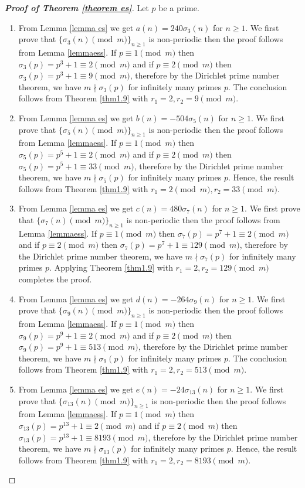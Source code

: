 \documentclass[12pt,reqno]{amsart}
\begin{document}
\begin{proof}[\textbf{Proof of Theorem \ref{theorem es}}]
Let $p$ be a prime. 
\noindent
\begin{enumerate}
    \item From Lemma \ref{lemma es} we get $a(n)=240\sigma_3(n)$ for $n\geq1$. We first prove that $\{\sigma_3(n) \pmod{m}\}_{n\geq1}$ is non-periodic then the proof follows from Lemma \ref{lemmaess}. If $p\equiv 1 \pmod{m}$ then $\sigma_3(p)=p^3+1\equiv 2 \pmod{m}$ and if $p\equiv 2 \pmod{m}$ then $\sigma_3(p)=p^3+1\equiv 9 \pmod{m}$, therefore by the Dirichlet prime number theorem, we have $m\nmid \sigma_3(p)$ for infinitely many primes $p$. The conclusion follows from Theorem \ref{thm1.9} with $r_1=2,r_2=9 \pmod{m}$.
    \item From Lemma \ref{lemma es} we get $b(n)=-504\sigma_5(n)$ for $n\geq1$. We first prove that $\{\sigma_5(n) \pmod{m}\}_{n\geq1}$ is non-periodic then the proof follows from Lemma \ref{lemmaess}. If $p\equiv 1 \pmod{m}$ then $\sigma_5(p)=p^5+1\equiv 2 \pmod{m}$ and if $p\equiv 2 \pmod{m}$ then $\sigma_5(p)=p^5+1\equiv 33 \pmod{m}$, therefore by the Dirichlet prime number theorem, we have $m\nmid \sigma_5(p)$ for infinitely many primes $p$. Hence, the result follows from Theorem \ref{thm1.9} with $r_1=2 \pmod{m},r_2=33 \pmod{m}$.
     \item From Lemma \ref{lemma es} we get $c(n)=480\sigma_7(n)$ for $n\geq1$. We first prove that $\{\sigma_7(n) \pmod{m}\}_{n\geq1}$ is non-periodic then the proof follows from Lemma \ref{lemmaess}. If $p\equiv 1 \pmod{m}$ then $\sigma_7(p)=p^7+1\equiv 2 \pmod{m}$ and if $p\equiv 2 \pmod{m}$ then $\sigma_7(p)=p^7+1\equiv 129 \pmod{m}$, therefore by the Dirichlet prime number theorem, we have $m\nmid \sigma_7(p)$ for infinitely many primes $p$. Applying Theorem \ref{thm1.9} with $r_1=2,r_2=129\pmod{m}$ completes the proof.
      \item From Lemma \ref{lemma es} we get $d(n)=-264\sigma_9(n)$ for $n\geq1$. We first prove that $\{\sigma_9(n) \pmod{m}\}_{n\geq1}$ is non-periodic then the proof follows from Lemma \ref{lemmaess}. If $p\equiv 1 \pmod{m}$ then $\sigma_9(p)=p^9+1\equiv 2 \pmod{m}$ and if $p\equiv 2 \pmod{m}$ then $\sigma_9(p)=p^9+1\equiv 513\pmod{m}$, therefore by the Dirichlet prime number theorem, we have $m\nmid \sigma_9(p)$ for infinitely many primes $p$. The conclusion follows from Theorem \ref{thm1.9} with $r_1=2,r_2=513\pmod{m}$.
       \item From Lemma \ref{lemma es} we get $e(n)=-24\sigma_{13}(n)$ for $n\geq1$. We first prove that $\{\sigma_{13}(n) \pmod{m}\}_{n\geq1}$ is non-periodic then the proof follows from Lemma \ref{lemmaess}. If $p\equiv 1 \pmod{m}$ then $\sigma_{13}(p)=p^{13}+1\equiv 2 \pmod{m}$ and if $p\equiv 2 \pmod{m}$ then $\sigma_{13}(p)=p^{13}+1\equiv 8193\pmod{m}$, therefore by the Dirichlet prime number theorem, we have $m\nmid \sigma_{13}(p)$ for infinitely many primes $p$. Hence, the result follows from Theorem \ref{thm1.9} with $r_1=2,r_2=8193\pmod{m}$.
    \end{enumerate}
\end{proof}
\end{document}
